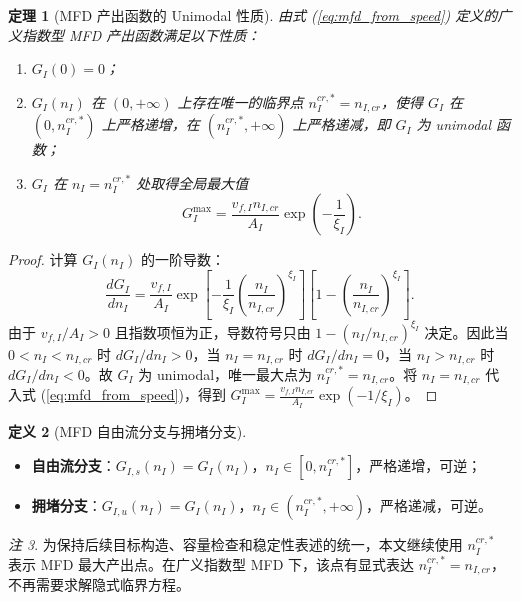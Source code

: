\documentclass[a4paper,12pt]{article}
\theoremstyle{plain}
\newtheorem{theorem}{定理}[section]
\theoremstyle{definition}
\newtheorem{definition}[theorem]{定义}
\theoremstyle{remark}
\newtheorem{remark}[theorem]{注}
\begin{document}
\begin{theorem}[MFD 产出函数的 Unimodal 性质]\label{thm:mfd_unimodal}
由式 (\ref{eq:mfd_from_speed}) 定义的广义指数型 MFD 产出函数满足以下性质：
\begin{enumerate}
    \item $G_I(0) = 0$；
    \item $G_I(n_I)$ 在 $(0, +\infty)$ 上存在唯一的临界点 $n_I^{cr,*}=n_{I,cr}$，使得 $G_I$ 在 $(0, n_I^{cr,*})$ 上严格递增，在 $(n_I^{cr,*}, +\infty)$ 上严格递减，即 $G_I$ 为 unimodal 函数；
    \item $G_I$ 在 $n_I = n_I^{cr,*}$ 处取得全局最大值
    \begin{equation}
        G_I^{\max}
        =
        \frac{v_{f,I}n_{I,cr}}{A_I}
        \exp\left(-\frac{1}{\xi_I}\right).
    \end{equation}
\end{enumerate}
\end{theorem}

\begin{proof}
计算 $G_I(n_I)$ 的一阶导数：
\begin{equation}
    \frac{dG_I}{dn_I}
    =
    \frac{v_{f,I}}{A_I}
    \exp\left[
        -\frac{1}{\xi_I}
        \left(\frac{n_I}{n_{I,cr}}\right)^{\xi_I}
    \right]
    \left[
        1-\left(\frac{n_I}{n_{I,cr}}\right)^{\xi_I}
    \right].
\end{equation}
由于 $v_{f,I}/A_I>0$ 且指数项恒为正，导数符号只由 $1-(n_I/n_{I,cr})^{\xi_I}$ 决定。因此当 $0<n_I<n_{I,cr}$ 时 $dG_I/dn_I>0$，当 $n_I=n_{I,cr}$ 时 $dG_I/dn_I=0$，当 $n_I>n_{I,cr}$ 时 $dG_I/dn_I<0$。故 $G_I$ 为 unimodal，唯一最大点为 $n_I^{cr,*}=n_{I,cr}$。将 $n_I=n_{I,cr}$ 代入式 (\ref{eq:mfd_from_speed})，得到 $G_I^{\max}=\frac{v_{f,I}n_{I,cr}}{A_I}\exp(-1/\xi_I)$。
\end{proof}

\begin{definition}[MFD 自由流分支与拥堵分支]
\begin{itemize}
    \item \textbf{自由流分支}：$G_{I,s}(n_I) = G_I(n_I)$，$n_I \in [0, n_I^{cr,*}]$，严格递增，可逆；
    \item \textbf{拥堵分支}：$G_{I,u}(n_I) = G_I(n_I)$，$n_I \in (n_I^{cr,*}, +\infty)$，严格递减，可逆。
\end{itemize}
\end{definition}

\begin{remark}
为保持后续目标构造、容量检查和稳定性表述的统一，本文继续使用 $n_I^{cr,*}$ 表示 MFD 最大产出点。在广义指数型 MFD 下，该点有显式表达 $n_I^{cr,*}=n_{I,cr}$，不再需要求解隐式临界方程。
\end{remark}
\end{document}
